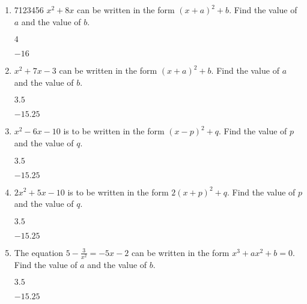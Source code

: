 \begin{enumerate}%

\item 7123456 $x^2+8x$ can be written in the form $(x+a)^2+b$. Find the value of $a$ and the value of $b$.
    \begin{envAnswer}[blankline=3]         $     4          $ \end{envAnswer}
    \begin{envAnswer}[blankline=5]         $   -16          $ \end{envAnswer}


\item $x^2+7x -3$ can be written in the form $(x+a)^2+b$. Find the value of $a$ and the value of $b$.
    \begin{envAnswer}[blankline=3]         $     3.5        $ \end{envAnswer}
    \begin{envAnswer}[blankline=5]         $   -15.25       $ \end{envAnswer}


\item $x^2-6x -10$ is to be written in the form $(x-p)^2+q$. Find the value of $p$ and the value of $q$.
    \begin{envAnswer}[blankline=3]         $     3.5        $ \end{envAnswer}
    \begin{envAnswer}[blankline=0]         $   -15.25       $ \end{envAnswer}


\item $2x^2+5x -10$ is to be written in the form $2(x+p)^2+q$. Find the value of $p$ and the value of $q$.
    \begin{envAnswer}[blankline=3]         $     3.5        $ \end{envAnswer}
    \begin{envAnswer}[blankline=0]         $   -15.25       $ \end{envAnswer}


\item The equation $5-\frac{3}{x^2}=-5x-2$ can be written in the form $x^3+ax^2+b=0$. Find the value of $a$ and the value of $b$.
    \begin{envAnswer}[blankline=3]         $     3.5        $ \end{envAnswer}
    \begin{envAnswer}[blankline=0]         $   -15.25       $ \end{envAnswer}




\end{enumerate}

